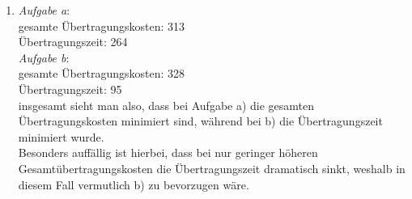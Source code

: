 \documentclass[a4paper]{article}
\begin{document}
\begin{enumerate}[label=\alph*)]
\item \textit{Aufgabe a}:\\
gesamte Übertragungskosten: 313\\
Übertragungszeit: 264\\
\textit{Aufgabe b}:\\
gesamte Übertragungskosten: 328\\
Übertragungszeit: 95\\
insgesamt sieht man also, dass bei Aufgabe a) die gesamten Übertragungskosten minimiert sind, während bei b) die Übertragungszeit minimiert wurde.\\
Besonders auffällig ist hierbei, dass bei nur geringer höheren Gesamtübertragungskosten die Übertragungszeit dramatisch sinkt, weshalb in diesem Fall vermutlich b) zu bevorzugen wäre.
\end{enumerate}
\end{document}
